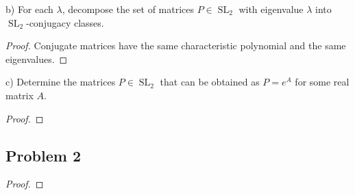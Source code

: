 \documentclass{article}
\theoremstyle{definition}
\newcommand{\SL}{\operatorname{SL}}
\begin{document}
\begin{tcolorbox}
b) For each $\lambda$, decompose the set of matrices $P \in \SL_2$ with eigenvalue $\lambda$ into $\SL_2$-conjugacy classes.
\end{tcolorbox}

\begin{proof}
Conjugate matrices have the same characteristic polynomial and the same eigenvalues.
\end{proof}

\begin{tcolorbox}
c) Determine the matrices $P \in \SL_2$ that can be obtained as $P = e^A$ for some real matrix $A$.
\end{tcolorbox}

\begin{proof}
\end{proof}

\subsection*{Problem 2}

\begin{tcolorbox}
\end{tcolorbox}

\begin{proof}
\end{proof}
\end{document}
